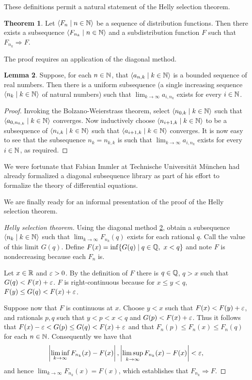 \documentclass[leqno]{article}
\theoremstyle{definition}
\newtheorem{theorem}{Theorem}[section]
\newtheorem{lemma}[theorem]{Lemma}
\newcommand{\bldset}[2]{\{{#1}\mid{#2}\}}
\newcommand{\bldseq}[2]{\langle{#1}\mid{#2}\rangle}
\begin{document}
These definitions permit a natural statement of the Helly selection theorem.

\begin{theorem}
Let $\bldseq{F_n}{n \in \N}$ be a sequence of distribution functions. Then there exists a subsequence $\bldseq{F_{n_k}}{n \in \N}$ and a subdistribution function $F$ such that $F_{n_k} \Rightarrow F$.
\end{theorem}

The proof requires an application of the diagonal method.

\begin{lemma} \label{lem:diag}
Suppose, for each $n \in \mathbb{N}$, that $\bldseq{a_{n,k}}{k \in \N}$ is a bounded sequence of real numbers. Then there is a uniform subsequence (a single increasing sequence $\bldseq{n_k}{k \in \N}$ of natural numbers) such that $\lim_{k \rightarrow \infty} a_{i,n_k}$ exists for every $i \in \mathbb{N}$.
\end{lemma}

\begin{proof}
Invoking the Bolzano-Weierstrass theorem, select $\bldseq{n_{0,k}}{k \in \N}$ such that $\bldseq{a_{0,n_{0,k}}}{k \in \N}$ converges. Now inductively choose $\bldseq{n_{i+1,k}}{k \in \N}$ to be a subsequence of $\bldseq{n_{i,k}}{k \in \N}$ such that $\bldseq{a_{i+1,k}}{k \in \N}$ converges. It is now easy to see that the subsequence $n_k = n_{k,k}$ is such that $\lim_{k \rightarrow \infty} a_{i,n_k}$ exists for every $i \in \mathbb{N}$, as required.
\end{proof}

We were fortunate that Fabian Immler at Technische Universit\"at M\"unchen had already formalized a diagonal subsequence library as part of his effort to formalize the theory of differential equations.

We are finally ready for an informal presentation of the proof of the Helly selection theorem.

\begin{proof}[Helly selection theorem]
Using the diagonal method \ref{lem:diag}, obtain a subsequence $\bldseq{n_k}{k \in \N}$ such that $\lim_{k \rightarrow \infty} F_{n_k}(q)$ exists for each rational $q$. Call the value of this limit $G(q)$. Define $F(x) = \inf \bldset{G(q)}{q \in \Q, \ x < q}$ and note $F$ is nondecreasing because each $F_n$ is.

Let $x \in \mathbb{R}$ and $\varepsilon > 0$. By the definition of $F$ there is $q \in \mathbb{Q}$, $q > x$ such that $G(q) < F(x) + \varepsilon$. $F$ is right-continuous because for $x \le y < q$, $F(y) \le G(q) < F(x) + \varepsilon$.

Suppose now that $F$ is continuous at $x$. Choose $y < x$ such that $F(x) < F(y) + \varepsilon$, and rationals $p,q$ such that $y < p < x < q$ and $G(p) < F(x) + \varepsilon$. Thus it follows that $F(x) - \varepsilon < G(p) \le G(q) < F(x) + \varepsilon$ and that $F_n(p) \le F_n(x) \le F_n(q)$ for each $n \in \mathbb{N}$. Consequently we have that
\[\left|\liminf_{k \rightarrow \infty} F_{n_k}(x) - F(x)\right|, \left|\limsup_{k \rightarrow \infty} F_{n_k}(x) - F(x)\right| < \varepsilon, \]
and hence $\lim_{k \rightarrow \infty} F_{n_k}(x) = F(x)$, which establishes that $F_{n_k} \Rightarrow F$.
\end{proof}
\end{document}
